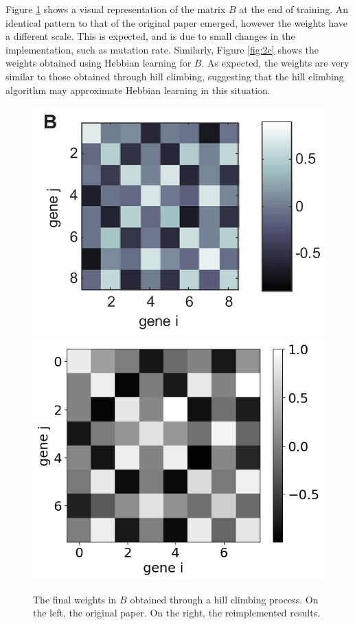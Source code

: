 \documentclass[twocolumn,a4paper,11pt]{article}
\begin{document}
    Figure \ref{fig:2b} shows a visual representation of the matrix $B$ at the end of training. An identical pattern to that of the original paper emerged, however the weights have a different scale. This is expected, and is due to small changes in the implementation, such as mutation rate. Similarly, Figure \ref{fig:2c} shows the weights obtained using Hebbian learning for $B$. As expected, the weights are very similar to those obtained through hill climbing, suggesting that the hill climbing algorithm may approximate Hebbian learning in this situation.

    \begin{figure}[h]
        \centering
        \includegraphics[width=0.48\linewidth]{orig_img/fig2b.png}
        \includegraphics[width=0.48\linewidth]{img/fig2b.png}
        \caption{The final weights in $B$ obtained through a hill climbing process. On the left, the original paper. On the right, the reimplemented results.} \label{fig:2b}
    \end{figure}
\end{document}
